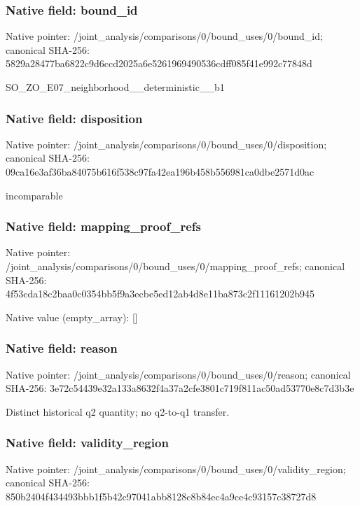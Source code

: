 \documentclass[10pt,a4paper]{article}
\begin{document}
\subsubsection{Native field: bound\_\allowbreak{}id}
Native pointer: /joint\_\allowbreak{}analysis/comparisons/0/bound\_\allowbreak{}uses/0/bound\_\allowbreak{}id; canonical SHA-256: 5829a28477ba6822c9d6ccd2025a6e5261969490536cdff085f41e992c77848d

\begingroup\raggedright\sloppy SO\_\allowbreak{}ZO\_\allowbreak{}E07\_\allowbreak{}neighborhood\_\allowbreak{}\_\allowbreak{}deterministic\_\allowbreak{}\_\allowbreak{}b1\par\endgroup

\subsubsection{Native field: disposition}
Native pointer: /joint\_\allowbreak{}analysis/comparisons/0/bound\_\allowbreak{}uses/0/disposition; canonical SHA-256: 09ca16e3af36ba84075b616f538c97fa42ea196b458b556981ca0dbe2571d0ac

\begingroup\raggedright\sloppy incomparable\par\endgroup

\subsubsection{Native field: mapping\_\allowbreak{}proof\_\allowbreak{}refs}
Native pointer: /joint\_\allowbreak{}analysis/comparisons/0/bound\_\allowbreak{}uses/0/mapping\_\allowbreak{}proof\_\allowbreak{}refs; canonical SHA-256: 4f53cda18c2baa0c0354bb5f9a3ecbe5ed12ab4d8e11ba873c2f11161202b945

Native value (empty\_\allowbreak{}array): []

\subsubsection{Native field: reason}
Native pointer: /joint\_\allowbreak{}analysis/comparisons/0/bound\_\allowbreak{}uses/0/reason; canonical SHA-256: 3e72c54439e32a133a8632f4a37a2cfe3801c719f811ac50ad53770e8c7d3b3e

\begingroup\raggedright\sloppy Distinct historical q2 quantity;\allowbreak{} no q2-to-q1 transfer.\par\endgroup

\subsubsection{Native field: validity\_\allowbreak{}region}
Native pointer: /joint\_\allowbreak{}analysis/comparisons/0/bound\_\allowbreak{}uses/0/validity\_\allowbreak{}region; canonical SHA-256: 850b2404f434493bbb1f5b42c97041abb8128c8b84ec4a9ce4c93157c38727d8
\end{document}

